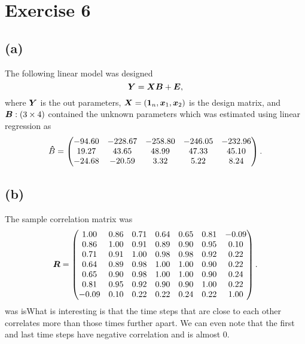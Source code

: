 \section*{Exercise 6}
\label{sec:exercise-6}

\subsection*{(a)}
\label{sec:a-5}


The following linear model was designed
\begin{equation*}
  \bm{Y} = \bm{XB} + \bm{E},
\end{equation*}
where $\bm{Y}$ is the out parameters, $\bm{X} = (\bm{1}_n, \bm{x}_1, \bm{x}_2)$
is the design matrix, and $\bm{B}:(3 \times 4) $ contained the unknown parameters which
was estimated using linear regression as
\begin{equation*}
  \bm{\hat} B =
  \begin{pmatrix}
    -94.60 &-228.67 &-258.80 &-246.05 &-232.96 \\ 
    19.27 &43.65 &48.99 &47.33 &45.10 \\ 
    -24.68 &-20.59 &3.32 &5.22 &8.24 
  \end{pmatrix}.
\end{equation*}

\subsection*{(b)}
The sample correlation matrix was 
\begin{equation*}
  \bm{R} =
  \begin{pmatrix}
    1.00 &0.86 &0.71 &0.64 &0.65 &0.81 &-0.09 \\ 
    0.86 &1.00 &0.91 &0.89 &0.90 &0.95 &0.10 \\ 
    0.71 &0.91 &1.00 &0.98 &0.98 &0.92 &0.22 \\ 
    0.64 &0.89 &0.98 &1.00 &1.00 &0.90 &0.22 \\ 
    0.65 &0.90 &0.98 &1.00 &1.00 &0.90 &0.24 \\ 
    0.81 &0.95 &0.92 &0.90 &0.90 &1.00 &0.22 \\ 
    -0.09 &0.10 &0.22 &0.22 &0.24 &0.22 &1.00  
  \end{pmatrix}.
\end{equation*}
was isWhat is interesting is that the time steps that are close to each other
correlates more than those times further apart. We can even note that
the first and last time steps have negative correlation and is almost 0.

